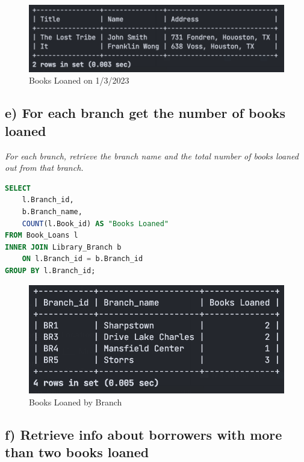 \documentclass{article}
\begin{document}
\begin{figure}[!h]
    \centering
    \includegraphics[scale=0.6]{images/q4-d-results.png}
    \caption{Books Loaned on 1/3/2023}
    \label{fig:q4_d_books}
\end{figure}

\subsection{e) For each branch get the number of books loaned}

\textit{For each branch, retrieve the branch name and the total number of books loaned
out from that branch.}

\begin{lstlisting}[language=SQL,
    deletekeywords={IDENTITY},
    deletekeywords={[2]INT},
    morekeywords={clustered},
    framesep=8pt,
    xleftmargin=40pt,
    framexleftmargin=40pt,
    frame=tb,
    framerule=0pt ]
SELECT
    l.Branch_id,
    b.Branch_name,
    COUNT(l.Book_id) AS "Books Loaned"
FROM Book_Loans l
INNER JOIN Library_Branch b
    ON l.Branch_id = b.Branch_id
GROUP BY l.Branch_id; 
\end{lstlisting}

\begin{figure}[!h]
    \centering
    \includegraphics[scale=0.6]{images/q4-e-results.png}
    \caption{Books Loaned by Branch}
    \label{fig:q4_e_books}
\end{figure}

\newpage
\subsection{f) Retrieve info about borrowers with more than two books loaned}
\end{document}
